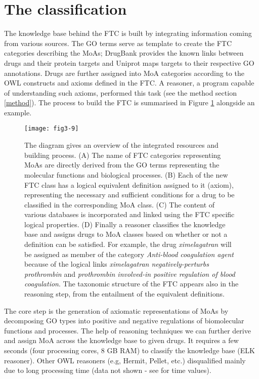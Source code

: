 \section{The classification}
The knowledge base behind the FTC is built by integrating information coming from various sources. The GO terms serve as template to create the FTC categories describing the MoAs; DrugBank provides the known links between drugs and their protein targets and Uniprot  maps targets to their respective GO annotations. Drugs are further assigned into MoA categories according to the OWL constructs and axioms defined in the FTC. A reasoner, a program capable of understanding such axioms, performed this task (see the method section \ref{method}). The process to build the FTC is summarised in Figure \ref{fig3-9} alongside an example. 

\begin{figure}[H]
    \centering
    \texttt{[image: fig3-9]}
    \caption{The diagram gives an overview of the integrated resources and building process. (A) The name of FTC categories representing MoAs are directly derived from the GO terms representing the molecular functions and biological processes. (B) Each of the new FTC class has a logical equivalent definition assigned to it (axiom), representing the necessary and sufficient conditions for a drug to be classified in the corresponding MoA class. (C) The content of various databases is incorporated and linked using the FTC specific logical properties. (D) Finally a reasoner classifies the knowledge base and assigns drugs to MoA classes based on whether or not a definition can be satisfied. For example, the drug \emph{ximelagatran} will be assigned as member of the category \emph{Anti-blood coagulation agent} because of the logical links \emph{ximelagatran negatively-perturbs prothrombin} and \emph{prothrombin involved-in positive regulation of blood coagulation}. The taxonomic structure of the FTC appears also in the reasoning step, from the entailment of the equivalent definitions.}
    \label{fig3-9}
\end{figure}

The core step is the generation of axiomatic representations of MoAs by decomposing GO types into positive and negative regulations of biomolecular functions and processes. The help of reasoning techniques we can further derive and assign MoA across the knowledge base to given drugs. It requires a few seconds (four processing cores, 8 GB RAM) to classify the knowledge base (ELK reasoner). Other OWL reasoners (e.g, Hermit, Pellet, etc.) disqualified mainly due to long processing time (data not shown - see \cite{gonccalves2013owl} for time values).

